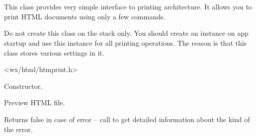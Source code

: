 %
%

\section{}\label{wxhtmleasyprinting}

This class provides very simple interface to printing 
architecture. It allows you to print HTML documents using
only a few commands. 


Do not create this class on the stack only. You should create an instance on app 
startup and use this instance for all printing operations. The reason is that
this class stores various settings in it.




<wx/html/htmprint.h>





\label{wxhtmleasyprintingwxhtmleasyprinting}


Constructor.




\label{wxhtmleasyprintingpreviewfile}


Preview HTML file. 

Returns false in case of error -- call
 to get detailed
information about the kind of the error.


\label{wxhtmleasyprintingpreviewtext}

